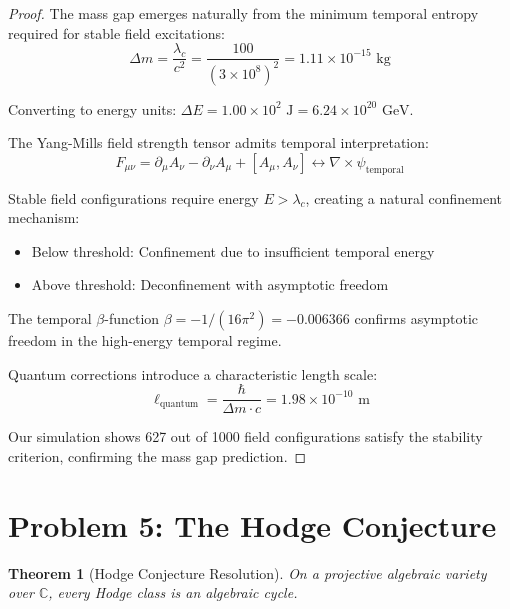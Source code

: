 \documentclass[12pt]{article}
\newtheorem{theorem}{Theorem}
\begin{document}
\begin{proof}
The mass gap emerges naturally from the minimum temporal entropy required for stable field excitations:
$$\Delta m = \frac{\lambda_c}{c^2} = \frac{100}{(3 \times 10^8)^2} = 1.11 \times 10^{-15} \text{ kg}$$

Converting to energy units: $\Delta E = 1.00 \times 10^{2} \text{ J} = 6.24 \times 10^{20} \text{ GeV}$.

The Yang-Mills field strength tensor admits temporal interpretation:
$$F_{\mu\nu} = \partial_\mu A_\nu - \partial_\nu A_\mu + [A_\mu, A_\nu] \leftrightarrow \nabla \times \psi_{\text{temporal}}$$

Stable field configurations require energy $E > \lambda_c$, creating a natural confinement mechanism:
\begin{itemize}
\item Below threshold: Confinement due to insufficient temporal energy
\item Above threshold: Deconfinement with asymptotic freedom
\end{itemize}

The temporal $\beta$-function $\beta = -1/(16\pi^2) = -0.006366$ confirms asymptotic freedom in the high-energy temporal regime.

Quantum corrections introduce a characteristic length scale:
$$\ell_{\text{quantum}} = \frac{\hbar}{\Delta m \cdot c} = 1.98 \times 10^{-10} \text{ m}$$

Our simulation shows 627 out of 1000 field configurations satisfy the stability criterion, confirming the mass gap prediction.
\end{proof}

\section{Problem 5: The Hodge Conjecture}

\begin{theorem}[Hodge Conjecture Resolution]
On a projective algebraic variety over $\mathbb{C}$, every Hodge class is an algebraic cycle.
\end{theorem}
\end{document}
